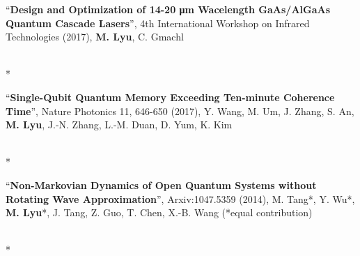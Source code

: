 \newcommand\publication[3]{
  \begin{minipage}[t]{\dimexpr(\linewidth) - 1.5em}
    ``\textbf{#1}'', #2, #3
  \end{minipage}
  \\*
}
\publication{Design and Optimization of 14-20 μm Wacelength GaAs/AlGaAs 
  Quantum Cascade Lasers}{4th International Workshop on Infrared
  Technologies (2017)}{\textbf{M. Lyu}, C. Gmachl}
\publication{Single-Qubit Quantum Memory Exceeding Ten-minute Coherence Time}
  {Nature Photonics 11, 646-650 (2017)}{Y. Wang, M. Um, J. Zhang, S. An, 
    \textbf{M. Lyu}, J.-N. Zhang, L.-M. Duan, D. Yum, K. Kim}
\publication{Non-Markovian Dynamics of Open Quantum Systems without Rotating 
  Wave Approximation}{Arxiv:1047.5359 (2014)}{M. Tang*, Y. Wu*, 
  \textbf{M. Lyu}*, J. Tang, Z. Guo, T. Chen, X.-B. Wang 
  (*equal contribution)}

